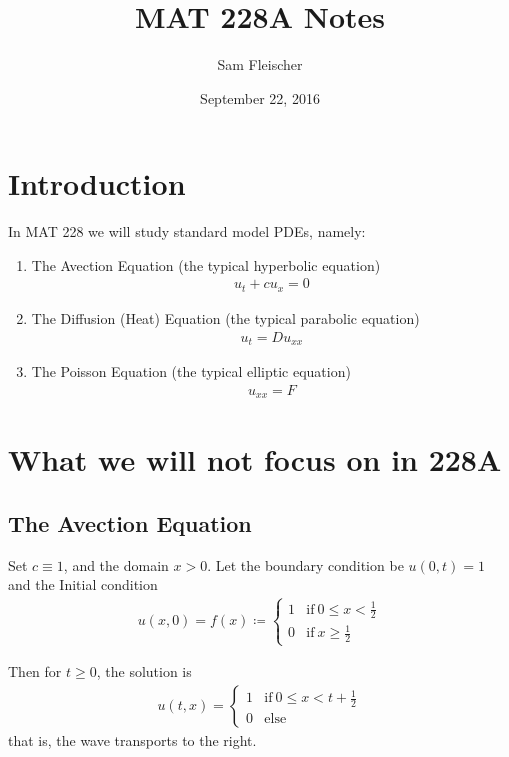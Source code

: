 \documentclass{article}
\title{MAT 228A Notes}
\author{Sam Fleischer}
\date{September 22, 2016}
\begin{document}
    \maketitle

    \section{Introduction}

        In MAT 228 we will study standard model PDEs, namely:
        \begin{enumerate}
            \item The Avection Equation (the typical hyperbolic equation)
            \begin{align*}
                u_t + c u_x = 0
            \end{align*}
            \item The Diffusion (Heat) Equation (the typical parabolic equation)
            \begin{align*}
                u_t = D u_{xx}
            \end{align*}
            \item The Poisson Equation (the typical elliptic equation)
            \begin{align*}
                u_{xx} = F
            \end{align*}
        \end{enumerate}

    \section{What we will not focus on in 228A}
        \subsection{The Avection Equation}

            Set $c \equiv 1$, and the domain $x > 0$.  Let the boundary condition be $u(0, t) = 1$ and the Initial condition
            \begin{align*}
                u(x,0) = f(x) \coloneqq \begin{cases}
                    1 & \text{if}\ 0 \leq x < \frac{1}{2} \\ 0 & \text{if}\ x \geq \frac{1}{2}
                \end{cases}
            \end{align*}

            Then for $t \geq 0$, the solution is
            \begin{align*}
                u(t,x) = \begin{cases}
                    1 & \text{if}\ 0 \leq x < t + \frac{1}{2} \\
                    0 & \text{else}
                \end{cases}
            \end{align*}
            that is, the wave transports to the right.
\end{document}
